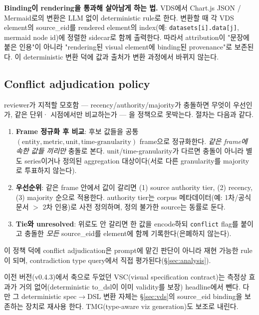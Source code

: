 \documentclass[11pt]{article}
\begin{document}
\textbf{Binding이 rendering을 통과해 살아남게 하는 법.} VDS에서 Chart.js JSON / Mermaid로의
변환은 LLM 없이 deterministic rule로 한다. 변환할 때 각 VDS element의 source\_eid를 rendered
element의 index(예: \texttt{datasets[i].data[j]}, mermaid node id)에 정렬한 sidecar로 함께
출력한다. 따라서 attribution이 "문장에 붙은 인용"이 아니라 "rendering된 visual element에 binding된
provenance"로 보존된다. 이 deterministic 변환 덕에 값과 출처가 변환 과정에서 바뀌지 않는다.

\subsection{Conflict adjudication policy}
\label{sec:policy}

reviewer가 지적할 모호함 — recency/authority/majority가 충돌하면 무엇이 우선인가, 같은 단위·
시점에서만 비교하는가 — 을 정책으로 못박는다. 절차는 다음과 같다.

\begin{enumerate}[leftmargin=*]
    \item \textbf{Frame 정규화 후 비교}: 후보 값들을 공통 $(\text{entity}, \text{metric},
    \text{unit}, \text{time-granularity})$ frame으로 정규화한다. \emph{같은 frame에 속한 값들
    끼리만} 충돌로 본다. unit/time-granularity가 다르면 충돌이 아니라 별도 series이거나 정의된
    aggregation 대상이다(서로 다른 granularity를 majority로 투표하지 않는다).
    \item \textbf{우선순위}: 같은 frame 안에서 값이 갈리면 (1) source authority tier, (2)
    recency, (3) majority 순으로 적용한다. authority tier는 corpus 메타데이터(예: 1차/공식
    문서 $>$ 2차 인용)로 사전 정의하며, 정의 불가한 source는 동률로 둔다.
    \item \textbf{Tie와 unresolved}: 위로도 안 갈리면 한 값을 encode하되 \texttt{conflict}
    flag를 붙이고 충돌한 \emph{모든} source\_eid를 element에 함께 기록한다(은폐하지 않는다).
\end{enumerate}

이 정책 덕에 conflict adjudication은 prompt에 맡긴 판단이 아니라 재현 가능한 rule이 되며,
contradiction type query에서 직접 평가된다(\S\ref{sec:analysis}).

이전 버전(v0.4.3)에서 축으로 두었던 VSC(visual specification contract)는 측정상 효과가 거의
없어(deterministic to\_dsl이 이미 validity를 보장) headline에서 뺀다. 다만 그 deterministic
spec$\rightarrow$DSL 변환 자체는 \S\ref{sec:vds}의 source\_eid binding을 보존하는 장치로 재사용
한다. TMG(type-aware viz generation)도 보조로 내린다.
\end{document}
